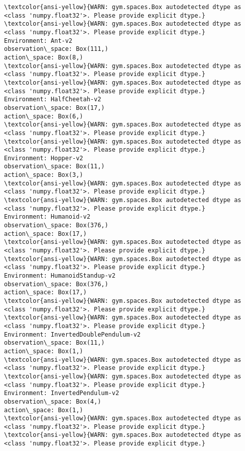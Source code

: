 \documentclass[11pt]{article}
\begin{document}
    \begin{Verbatim}[commandchars=\\\{\}]
\textcolor{ansi-yellow}{WARN: gym.spaces.Box autodetected dtype as <class 'numpy.float32'>. Please provide explicit dtype.}
\textcolor{ansi-yellow}{WARN: gym.spaces.Box autodetected dtype as <class 'numpy.float32'>. Please provide explicit dtype.}
Environment: Ant-v2
observation\_space: Box(111,)
action\_space: Box(8,)
\textcolor{ansi-yellow}{WARN: gym.spaces.Box autodetected dtype as <class 'numpy.float32'>. Please provide explicit dtype.}
\textcolor{ansi-yellow}{WARN: gym.spaces.Box autodetected dtype as <class 'numpy.float32'>. Please provide explicit dtype.}
Environment: HalfCheetah-v2
observation\_space: Box(17,)
action\_space: Box(6,)
\textcolor{ansi-yellow}{WARN: gym.spaces.Box autodetected dtype as <class 'numpy.float32'>. Please provide explicit dtype.}
\textcolor{ansi-yellow}{WARN: gym.spaces.Box autodetected dtype as <class 'numpy.float32'>. Please provide explicit dtype.}
Environment: Hopper-v2
observation\_space: Box(11,)
action\_space: Box(3,)
\textcolor{ansi-yellow}{WARN: gym.spaces.Box autodetected dtype as <class 'numpy.float32'>. Please provide explicit dtype.}
\textcolor{ansi-yellow}{WARN: gym.spaces.Box autodetected dtype as <class 'numpy.float32'>. Please provide explicit dtype.}
Environment: Humanoid-v2
observation\_space: Box(376,)
action\_space: Box(17,)
\textcolor{ansi-yellow}{WARN: gym.spaces.Box autodetected dtype as <class 'numpy.float32'>. Please provide explicit dtype.}
\textcolor{ansi-yellow}{WARN: gym.spaces.Box autodetected dtype as <class 'numpy.float32'>. Please provide explicit dtype.}
Environment: HumanoidStandup-v2
observation\_space: Box(376,)
action\_space: Box(17,)
\textcolor{ansi-yellow}{WARN: gym.spaces.Box autodetected dtype as <class 'numpy.float32'>. Please provide explicit dtype.}
\textcolor{ansi-yellow}{WARN: gym.spaces.Box autodetected dtype as <class 'numpy.float32'>. Please provide explicit dtype.}
Environment: InvertedDoublePendulum-v2
observation\_space: Box(11,)
action\_space: Box(1,)
\textcolor{ansi-yellow}{WARN: gym.spaces.Box autodetected dtype as <class 'numpy.float32'>. Please provide explicit dtype.}
\textcolor{ansi-yellow}{WARN: gym.spaces.Box autodetected dtype as <class 'numpy.float32'>. Please provide explicit dtype.}
Environment: InvertedPendulum-v2
observation\_space: Box(4,)
action\_space: Box(1,)
\textcolor{ansi-yellow}{WARN: gym.spaces.Box autodetected dtype as <class 'numpy.float32'>. Please provide explicit dtype.}
\textcolor{ansi-yellow}{WARN: gym.spaces.Box autodetected dtype as <class 'numpy.float32'>. Please provide explicit dtype.}

\end{Verbatim}
\end{document}
